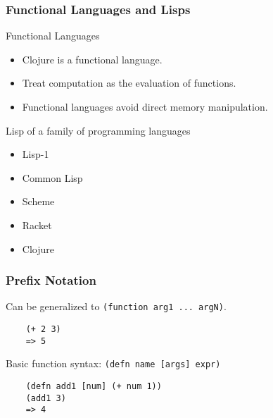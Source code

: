 \documentclass{beamer}
\newcommand{\clocode}[1]{{\texttt {#1}}}
\begin{document}
\begin{frame}[fragile]
\frametitle{Functional Languages and Lisps}
	Functional Languages
	\begin{itemize}
	 \item Clojure is a functional language.
  	 \item Treat computation as the evaluation of functions.
  	 \item Functional languages avoid direct memory manipulation.
       \end{itemize}
	Lisp of a family of programming languages 
		\begin{itemize}
		 \item Lisp-1 
		 \item Common Lisp
		 \item Scheme
		 \item Racket
		 \item Clojure
		\end{itemize}
\end{frame}
\begin{frame}[fragile]
\frametitle{Prefix Notation}
Can be generalized to \clocode{(function arg1 ... argN)}.
	\begin{verbatim}
	(+ 2 3)
	=> 5
	\end{verbatim}
Basic function syntax: \clocode{(defn name [args] expr)}
	\begin{verbatim}
	(defn add1 [num] (+ num 1))
	(add1 3)
	=> 4
	\end{verbatim}
\end{frame}
\end{document}
